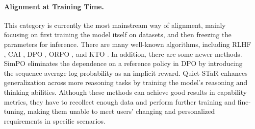 \paragraph{\textbf{Alignment at Training Time.}}
This category is currently the most mainstream way of alignment, mainly focusing on first training the model itself on datasets, and then freezing the parameters for inference. 
There are many well-known algorithms, including RLHF \citep{christiano2017deep, ouyang2022training}, CAI \citep{bai2022constitutional}, DPO \citep{rafailov2024direct}, ORPO \citep{hong2024reference}, and KTO \citep{ethayarajh2024kto}. 
In addition, there are some newer methods. SimPO \citep{meng2024simpo} eliminates the dependence on a reference policy in DPO by introducing the sequence average log probability as an implicit reward. Quiet-STaR \citep{zelikman2024quiet} enhances generalization across more reasoning tasks by training the model's reasoning and thinking abilities. 
Although these methods can achieve good results in capability metrics, they have to recollect enough data and perform further training and fine-tuning, making them unable to meet users' changing and personalized requirements in specific scenarios.

